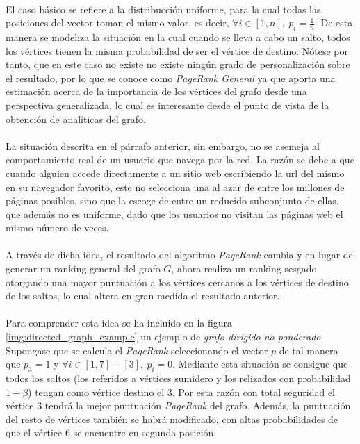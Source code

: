 \documentclass{subfiles}
\begin{document}
      \paragraph{}
      El caso básico se refiere a la distribucción uniforme, para la cual todas las posiciones del vector toman el mismo valor, es decir, $\forall i \in [1,n], \ p_i = \frac{1}{n}$. De esta manera se modeliza la situación en la cual cuando se lleva a cabo un salto, todos los vértices tienen la misma probabilidad de ser el vértice de destino. Nótese por tanto, que en este caso no existe no existe ningún grado de personalización sobre el resultado, por lo que se conoce como \emph{PageRank General} ya que aporta una estimación acerca de la importancia de los vértices del grafo desde una perspectiva generalizada, lo cual es interesante desde el punto de vista de la obtención de analíticas del grafo.

      \paragraph{}
      La situación descrita en el párrafo anterior, sin embargo, no se asemeja al comportamiento real de un usuario que navega por la red. La razón se debe a que cuando alguien accede directamente a un sitio web escribiendo la url del mismo en su navegador favorito, este no selecciona una al azar de entre los millones de páginas posibles, sino que la escoge de entre un reducido subconjunto de ellas, que además no es uniforme, dado que los usuarios no visitan las páginas web el mismo número de veces.

      \paragraph{}
      A través de dicha idea, el resultado del algoritmo \emph{PageRank} cambia y en lugar de generar un ranking general del grafo $G$, ahora realiza un ranking sesgado otorgando una mayor puntuación a los vértices cercanos a los vértices de destino de los saltos, lo cual altera en gran medida el resultado anterior.


      \paragraph{}
      Para comprender esta idea se ha incluido en la figura \ref{img:directed_graph_example} un ejemplo de \emph{grafo dirigido no ponderado}. Supongase que se calcula el \emph{PageRank} seleccionando el vector $p$ de tal manera que $p_3 =1$ y $\forall i \in [1,7] - [3], \ p_i = 0$. Mediante esta situación se consigue que todos los saltos (los referidos a vértices sumidero y los relizados con probabilidad $1-\beta$) tengan como vértice destino el $3$. Por esta razón con total seguridad el vértice $3$ tendrá la mejor puntuación \emph{PageRank} del grafo. Además, la puntuación del resto de vértices también se habrá modificado, con altas probabilidades de que el vértice $6$ se encuentre en segunda posición.
\end{document}
